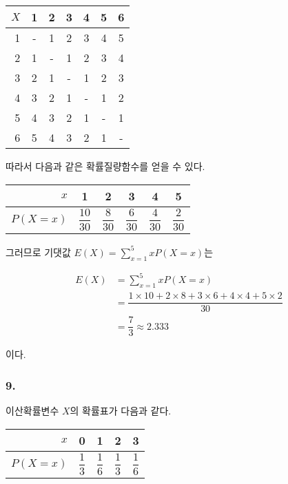 \begin{center}
	\begin{tabular}{r|cccccc}
		 $X$ & 1 & 2 & 3 & 4 & 5 & 6 \\
		 \hline
		 1 & - & 1 & 2 & 3 & 4 & 5 \\
		 2 & 1 & - & 1 & 2 & 3 & 4 \\
		 3 & 2 & 1 & - & 1 & 2 & 3 \\
		 4 & 3 & 2 & 1 & - & 1 & 2 \\
		 5 & 4 & 3 & 2 & 1 & - & 1 \\
		 6 & 5 & 4 & 3 & 2 & 1 & - \\
	\end{tabular}
\end{center}

따라서 다음과 같은 확률질량함수를 얻을 수 있다.

\begin{center}
	\begin{tabular}{r|ccccc}
		 $x$ & 1 & 2 & 3 & 4 & 5 \\
		 \hline
		 $P\left(X=x\right)$ & $\dfrac{10}{30}$ & $\dfrac{8}{30}$ & $\dfrac{6}{30}$ & $\dfrac{4}{30}$ & $\dfrac{2}{30}$ \\
	\end{tabular}
\end{center}

그러므로 기댓값 $\displaystyle E\left(X\right) = \sum_{x = 1}^5 xP\left(X = x\right)$는

\begin{align*}
	E\left(X\right) &= \sum_{x = 1}^5 xP\left(X = x\right)\\
	&= \dfrac{1\times 10+2\times 8+3\times 6+4\times 4+5\times 2}{30}\\
	&= \dfrac{7}{3} \approx 2.333
\end{align*}

이다.

\subsubsection{9.} 이산확률변수 $X$의 확률표가 다음과 같다.

\begin{center}
	\begin{tabular}{r|cccc}
		 $x$ & 0 & 1 & 2 & 3 \\
		 \hline
		 $P\left(X=x\right)$ & $\dfrac{1}{3}$ & $\dfrac{1}{6}$ & $\dfrac{1}{3}$ & $\dfrac{1}{6}$ \\
	\end{tabular}
\end{center}

